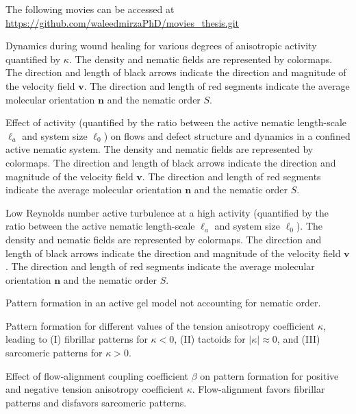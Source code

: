 
The following movies can be accessed at \href{https://github.com/waleedmirzaPhD/movies_thesis.git}{https://github.com/waleedmirzaPhD/movies\_thesis.git} \cite{movies_github}

\bigskip	

 \quad Dynamics during wound healing for various degrees of anisotropic activity quantified by $\kappa$. The density and nematic fields are represented by colormaps. The direction and length of black arrows indicate the direction and magnitude of the velocity field $\bm{v}$. The direction and length of red segments indicate the average molecular orientation $\bm{n}$ and the nematic order $S$.

\bigskip	


  \quad Effect of activity (quantified by the ratio between the active nematic length-scale $\ell_a$ and system size $\ell_0$)  on flows and defect structure and dynamics in a confined active nematic system.  The density and nematic fields are represented by colormaps. The direction and length of black arrows indicate the direction and magnitude of the velocity field $\bm{v}$. The direction and length of red segments indicate the average molecular orientation $\bm{n}$ and the nematic order $S$.	

\bigskip	

 \quad	 Low Reynolds number active turbulence at a high activity (quantified by the ratio between the active nematic length-scale $\ell_a$ and system size $\ell_0$).  The density and nematic fields are represented by colormaps. The direction and length of black arrows indicate the direction and magnitude of the velocity field $\bm{v}$. The direction and length of red segments indicate the average molecular orientation $\bm{n}$ and the nematic order $S$.

\bigskip	

 Pattern formation in an active gel model not accounting for nematic order.

\bigskip

 Pattern formation for different values of the tension anisotropy coefficient $\kappa$, leading to (I) fibrillar patterns for $\kappa <0$, (II) tactoids for $\vert \kappa \vert \approx 0$, and (III) sarcomeric patterns for  $\kappa >0$.

\bigskip

 Effect of flow-alignment coupling coefficient $\beta$ on pattern formation for positive and negative tension anisotropy coefficient $\kappa$. Flow-alignment favors fibrillar patterns and disfavors sarcomeric patterns. 

